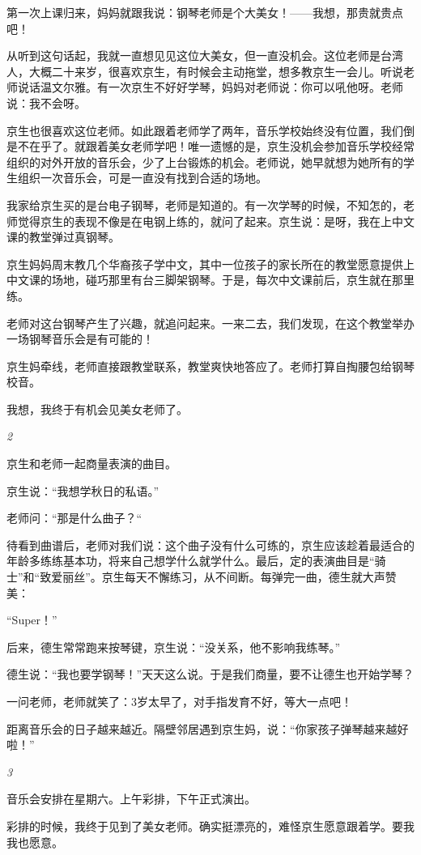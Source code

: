 \documentclass[twoside,openright,headings=optiontohead]{ctexbook} %
\begin{document}
{第一次上课归来，妈妈就跟我说：钢琴老师是个大美女！------我想，那贵就贵点吧！

从听到这句话起，我就一直想见见这位大美女，但一直没机会。这位老师是台湾人，大概二十来岁，很喜欢京生，有时候会主动拖堂，想多教京生一会儿。听说老师说话温文尔雅。有一次京生不好好学琴，妈妈对老师说：你可以吼他呀。老师说：我不会呀。

京生也很喜欢这位老师。如此跟着老师学了两年，音乐学校始终没有位置，我们倒是不在乎了。就跟着美女老师学吧！唯一遗憾的是，京生没机会参加音乐学校经常组织的对外开放的音乐会，少了上台锻炼的机会。老师说，她早就想为她所有的学生组织一次音乐会，可是一直没有找到合适的场地。

我家给京生买的是台电子钢琴，老师是知道的。有一次学琴的时候，不知怎的，老师觉得京生的表现不像是在电钢上练的，就问了起来。京生说：是呀，我在上中文课的教堂弹过真钢琴。

京生妈妈周末教几个华裔孩子学中文，其中一位孩子的家长所在的教堂愿意提供上中文课的场地，碰巧那里有台三脚架钢琴。于是，每次中文课前后，京生就在那里练。

老师对这台钢琴产生了兴趣，就追问起来。一来二去，我们发现，在这个教堂举办一场钢琴音乐会是有可能的！

京生妈牵线，老师直接跟教堂联系，教堂爽快地答应了。老师打算自掏腰包给钢琴校音。

我想，我终于有机会见美女老师了。

\emph{2}

京生和老师一起商量表演的曲目。

京生说：``我想学秋日的私语。''

老师问：``那是什么曲子？``

待看到曲谱后，老师对我们说：这个曲子没有什么可练的，京生应该趁着最适合的年龄多练练基本功，将来自己想学什么就学什么。最后，定的表演曲目是``骑士''和``致爱丽丝''。京生每天不懈练习，从不间断。每弹完一曲，德生就大声赞美：

``Super！''

后来，德生常常跑来按琴键，京生说：``没关系，他不影响我练琴。''

德生说：``我也要学钢琴！''天天这么说。于是我们商量，要不让德生也开始学琴？

一问老师，老师就笑了：3岁太早了，对手指发育不好，等大一点吧！

距离音乐会的日子越来越近。隔壁邻居遇到京生妈，说：``你家孩子弹琴越来越好啦！''

\emph{3}

音乐会安排在星期六。上午彩排，下午正式演出。

彩排的时候，我终于见到了美女老师。确实挺漂亮的，难怪京生愿意跟着学。要我我也愿意。

}
\end{document}
